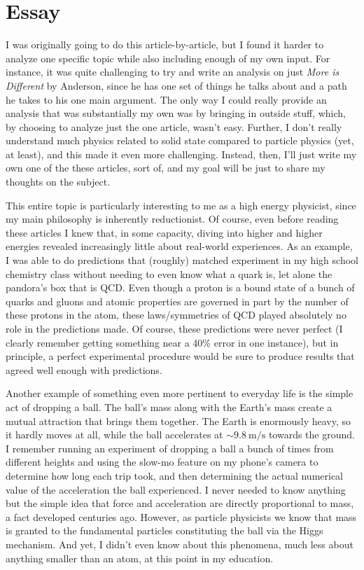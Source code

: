 \section{Essay}

I was originally going to do this article-by-article, but I found it harder to analyze one specific topic while also including enough of my own input. For instance, it was quite challenging to try and write an analysis on just \textit{More is Different} by Anderson, since he has one set of things he talks about and a path he takes to his one main argument. The only way I could really provide an analysis that was substantially my own was by bringing in outside stuff, which, by choosing to analyze just the one article, wasn't easy. Further, I don't really understand much physics related to solid state compared to particle physics (yet, at least), and this made it even more challenging. Instead, then, I'll just write my own one of the these articles, sort of, and my goal will be just to share my thoughts on the subject.

This entire topic is particularly interesting to me as a high energy physicist, since my main philosophy is inherently reductionist. Of course, even before reading these articles I knew that, in some capacity, diving into higher and higher energies revealed increasingly little about real-world experiences. As an example, I was able to do predictions that (roughly) matched experiment in my high school chemistry class without needing to even know what a quark is, let alone the pandora's box that is QCD. Even though a proton is a bound state of a bunch of quarks and gluons and atomic properties are governed in part by the number of these protons in the atom, these laws/symmetries of QCD played absolutely no role in the predictions made. Of course, these predictions were never perfect (I clearly remember getting something near a 40\% error in one instance), but in principle, a perfect experimental procedure would be sure to produce results that agreed well enough with predictions.

Another example of something even more pertinent to everyday life is the simple act of dropping a ball. The ball's mass along with the Earth's mass create a mutual attraction that brings them together. The Earth is enormously heavy, so it hardly moves at all, while the ball accelerates at $\sim\qty{9.8}{\meter\per\second}$ towards the ground. I remember running an experiment of dropping a ball a bunch of times from different heights and using the slow-mo feature on my phone's camera to determine how long each trip took, and then determining the actual numerical value of the acceleration the ball experienced. I never needed to know anything but the simple idea that force and acceleration are directly proportional to mass, a fact developed centuries ago. However, as particle physicists we know that mass is granted to the fundamental particles constituting the ball via the Higgs mechanism. And yet, I didn't even know about this phenomena, much less about anything smaller than an atom, at this point in my education.

